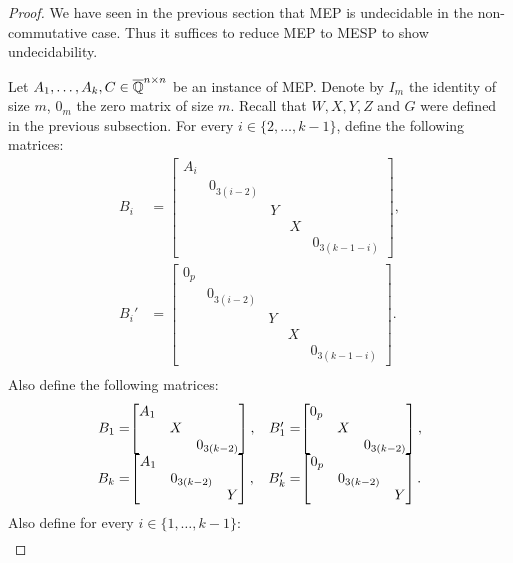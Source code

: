 \begin{proof}
We have seen in the previous section that MEP is undecidable in the non-commutative
case. Thus it suffices to reduce MEP to MESP to show undecidability.

Let $A_1,\ldots,A_k,C\in\overline{\mathbb{Q}}^{n\times n}$ be an instance of MEP. Denote by $I_m$ the identity of size $m$,
$0_m$ the zero matrix of size $m$. Recall that $W,X,Y,Z$ and $G$ were defined in the previous
subsection. For every $i\in\{2,\ldots,k-1\}$, define the following matrices:
\begin{align*}
B_i&=\begin{bmatrix}A_i&&&&\\&0_{3(i-2)}&&&\\&&Y&&\\&&&X&\\&&&&0_{3(k-1-i)}\end{bmatrix},\\
B_i'&=\begin{bmatrix}0_p&&&&\\&0_{3(i-2)}&&&\\&&Y&&\\&&&X&\\&&&&0_{3(k-1-i)}\end{bmatrix}.\\
\end{align*}
Also define the following matrices:
\[
\begin{array}{r@{}c@{}cr@{}c}
B_1=&\begin{bmatrix}A_1&&\\&X&\\&&0_{3(k-2)}\end{bmatrix},&&
B_1'=&\begin{bmatrix}0_p&&\\&X&\\&&0_{3(k-2)}\end{bmatrix},\\
B_k=&\begin{bmatrix}A_1&&\\&0_{3(k-2)}&\\&&Y\end{bmatrix},&&
B_k'=&\begin{bmatrix}0_p&&\\&0_{3(k-2)}&\\&&Y\end{bmatrix}.\\
\end{array}\]
Also define for every $i\in\{1,\ldots,k-1\}$:
\begin{align*}

\end{align*}
\end{proof}

